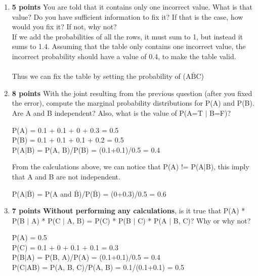 \documentclass{article}
\def\ans#1{{\color{ans}#1}}
\begin{document}
\begin{enumerate}[label=(\alph*)]
    \item \textbf{5 points} You are told that it contains only one incorrect value. What is that value? Do you have sufficient information to fix it? If that is the case, how would you fix it? If not, why not? \\
    \ans{
        If we add the probabilities of all the rows, it must sum to 1, but instead it sums to 1.4. 
        Assuming that the table only contains one incorrect value, the incorrect probability should have 
        a value of 0.4, to make the table valid. \\ \\
        Thus we can fix the table by setting the probability of (A$\bar{\text{B}}$C)
    } 
    \item \textbf{8 points} With the joint resulting from the previous question (after you fixed the error), compute the marginal probability distributions for P(A) and P(B). Are A and B independent? Also, what is the value of P(A=T $|$ B=F)?  \\
    \ans{
        \begin{center}
            P(A) = 0.1 + 0.1 + 0 + 0.3 = 0.5 \\
            P(B) = 0.1 + 0.1 + 0.1 + 0.2 = 0.5 \\
            P(A$|$B) = P(A, B)/P(B) = (0.1+0.1)/0.5 = 0.4 \\
        \end{center}
        From the calculations above, we can notice that P(A) != P(A|B), this imply that A and B 
        are not independent. \\
        \begin{center}
            P(A$|$$\bar{\text{B}}$) = P(A and $\bar{\text{B}}$)/P($\bar{\text{B}}$) = (0+0.3)/0.5 = 0.6 \\
        \end{center}
    }
    \item \textbf{7 points} \textbf{Without performing any calculations}, is it true that P(A) * P(B $|$ A) * P(C $|$ A, B) = P(C) * P(B $|$ C) * P(A $|$ B, C)? Why or why not?\\
    \ans{
        \begin{center}
            P(A) = 0.5 \\
            P(C) = 0.1 + 0 + 0.1 + 0.1 = 0.3 \\
            P(B$|$A) = P(B, A)/P(A) = (0.1+0.1)/0.5 = 0.4 \\
            P(C$|$AB) = P(A, B, C)/P(A, B) = 0.1/(0.1+0.1) = 0.5 \\

\end{center}}
\end{enumerate}
\end{document}
